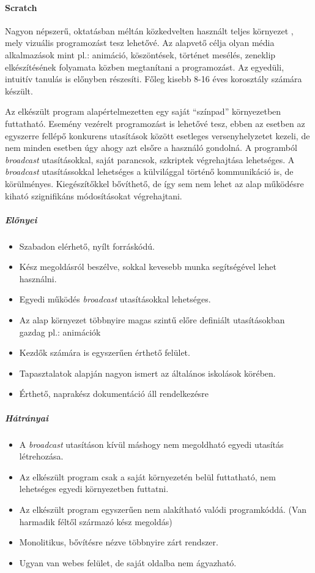 \documentclass[12pt,a4paper,oneside]{report} %
\begin{document}
\paragraph{Scratch} 
\label{scratch}
Nagyon népszerű, oktatásban méltán közkedvelten használt teljes környezet \cite{maloney2010scratch} \cite{resnick2009scratch} \cite{ScratchUrl2019Jan}, mely vizuális programozást tesz lehetővé. Az alapvető célja olyan média alkalmazások mint pl.: animáció, köszöntések, történet mesélés, zeneklip elkészítésének folyamata közben megtanítani a programozást. Az egyedüli, intuitív tanulás is előnyben részesíti. Főleg kisebb 8-16 éves korosztály számára készült. 
\par Az elkészült program alapértelmezetten egy saját ``{színpad}'' környezetben futtatható. Esemény vezérelt programozást is lehetővé tesz, ebben az esetben az egyszerre fellépő konkurens utasítások között esetleges versenyhelyzetet kezeli, de nem minden esetben úgy ahogy azt elsőre a használó gondolná.  A programból \textit{broadcast} utasításokkal, saját parancsok, szkriptek végrehajtása lehetséges. A \textit{broadcast} utasítássokkal lehetséges a külvilággal történő kommunikáció is, de körülményes. Kiegészítőkkel bővíthető, de így sem nem lehet az alap működésre kiható szignifikáns módosításokat végrehajtani.
\subparagraph{Előnyei} 
\begin{itemize}
	\item Szabadon elérhető, nyílt forráskódú.
	\item Kész megoldásról beszélve, sokkal kevesebb munka segítségével lehet használni.
	\item Egyedi működés \textit{broadcast} utasításokkal lehetséges.
	\item Az alap környezet többnyire magas szintű előre definiált utasításokban gazdag pl.: animációk
	\item Kezdők számára is egyszerűen érthető felület.
	\item Tapasztalatok alapján nagyon ismert az általános iskolások körében.
	\item Érthető, naprakész dokumentáció áll rendelkezésre
\end{itemize}
\subparagraph{Hátrányai} 
\begin{itemize}
	\item A \textit{broadcast} utasításon kívül máshogy nem megoldható egyedi utasítás létrehozása.
	\item Az elkészült program csak a saját környezetén belül futtatható, nem lehetséges egyedi környezetben futtatni.
	\item Az elkészült program egyszerűen nem alakítható valódi programkóddá. (Van harmadik féltől származó kész megoldás)
	\item Monolitikus, bővítésre nézve többnyire zárt rendszer.
	\item Ugyan van webes felület, de saját oldalba nem ágyazható.
\end{itemize}
\end{document}

